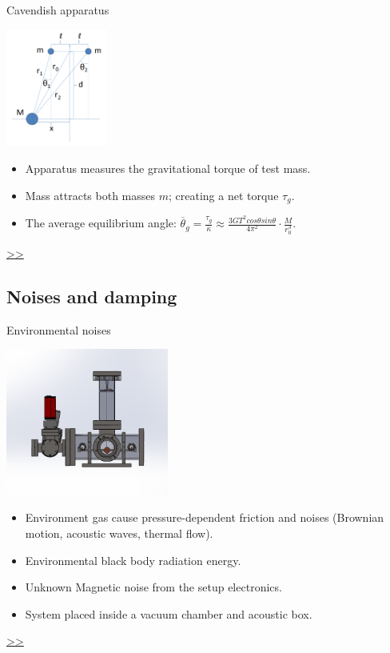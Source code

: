\documentclass{beamer}
\begin{document}
\begin{frame}{\hypertarget{frame:Cavendish apparatus}{Cavendish apparatus}}
	\begin{center}		
		\includegraphics[width=0.25\textwidth,keepaspectratio]{Cavendish apparatus.PNG}
    \end{center}
	\begin{itemize}
		\item Apparatus measures the gravitational torque of test mass.
		\item Mass attracts both masses $m$; creating a net torque $\tau_g$.
		\item The average equilibrium angle: $\overline{\theta}_g = \frac{\tau_g}{\kappa} \approx \frac{3GT^2cos\theta sin\theta}{4\pi^2 } \cdot \frac{M}{r_0^3}$.

	\end{itemize}
	\hyperlink{frame:Cavendish apparatus 1}{>>} 
\end{frame}


\subsection{Noises and damping}
\begin{frame}{\hypertarget{frame:Environmental noises}{Environmental noises}}
	\begin{center}		
		\includegraphics[width=0.4\textwidth,keepaspectratio]{total_chamber.png}
    \end{center}
	\begin{itemize}
		
		\item Environment gas cause pressure-dependent friction and noises (Brownian motion, acoustic waves, thermal flow).  
		\item Environmental black body radiation energy.
		\item Unknown Magnetic noise from the setup electronics.
		\item System placed inside a vacuum chamber and acoustic box. 
			
	\end{itemize}
	\hyperlink{frame:Environmental noises 1}{>>} 
\end{frame}
\end{document}
